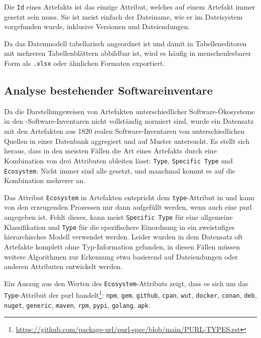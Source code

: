Die \texttt{Id} eines Artefakts ist das einzige Attribut, welches auf einem Artefakt immer gesetzt sein muss.
Sie ist meist einfach der Dateiname, wie er im Dateisystem vorgefunden wurde, inklusive Versionen und Dateiendungen.

Da das Datenmodell tabellarisch angeordnet ist und damit in Tabelleneditoren mit mehreren Tabellenblättern abbildbar ist, wird es häufig in menschenlesbarer Form als \texttt{.xlsx} oder ähnlichen Formaten exportiert.

\subsection{Analyse bestehender Softwareinventare}\label{subsec:analysis-ae-software-inventories}

Da die Darstellungsweisen von Artefakten unterschiedlicher Software-Ökosysteme in den \metaeffekt-Software-Inventaren nicht vollständig normiert sind, wurde ein Datensatz mit den Artefakten aus 1820 realen Software-Inventaren von unterschiedlichen Quellen in einer Datenbank aggregiert und auf Muster untersucht.
Es stellt sich heraus, dass in den meisten Fällen die Art eines Artefakts durch eine Kombination von drei Attributen ableiten lässt: \texttt{Type}, \texttt{Specific Type} und \texttt{Ecosystem}.
Nicht immer sind alle gesetzt, und manchmal kommt es auf die Kombination mehrerer an.

Das Attribut \texttt{Ecosystem} in Artefakten entspricht dem \texttt{type}-Attribut in  und kann von den erzeugenden Prozessen nur dann aufgefüllt werden, wenn auch eine \acrshort{purl} angegeben ist.
Fehlt dieses, kann meist \texttt{Specific Type} für eine allgemeine Klassifikation und \texttt{Type} für die spezifischere Einordnung in ein zweistufiges hierarchisches Modell verwendet werden.
Leider wurden in dem Datensatz oft Artefakte komplett ohne Typ-Information gefunden, in diesen Fällen müssen weitere Algorithmen zur Erkennung etwa basierend auf Dateiendungen oder anderen Attributen entwickelt werden.

Ein Auszug aus den Werten des \texttt{Ecosystem}-Attributs zeigt, dass es sich um das \texttt{Type}-Attribut der \acrshort{purl} handelt\footnote{\url{https://github.com/package-url/purl-spec/blob/main/PURL-TYPES.rst}}:
\texttt{npm}, \texttt{gem}, \texttt{github}, \texttt{cpan}, \texttt{wut}, \texttt{docker}, \texttt{conan}, \texttt{deb}, \texttt{nuget}, \texttt{generic}, \texttt{maven}, \texttt{rpm}, \texttt{pypi}, \texttt{golang}, \texttt{apk}.

